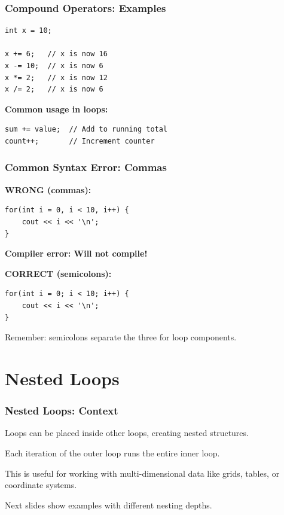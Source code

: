 \documentclass{beamer}
\begin{document}
\begin{frame}[fragile]
\frametitle{Compound Operators: Examples}
\begin{verbatim}
int x = 10;

x += 6;   // x is now 16
x -= 10;  // x is now 6
x *= 2;   // x is now 12
x /= 2;   // x is now 6
\end{verbatim}
\pause

\textbf{Common usage in loops:}
\begin{verbatim}
sum += value;  // Add to running total
count++;       // Increment counter
\end{verbatim}
\end{frame}

\begin{frame}[fragile]
\frametitle{Common Syntax Error: Commas}
\textbf{WRONG (commas):}
\begin{verbatim}
for(int i = 0, i < 10, i++) {
    cout << i << '\n';
}
\end{verbatim}
\pause

\textbf{Compiler error: Will not compile!}\pause

\textbf{CORRECT (semicolons):}
\begin{verbatim}
for(int i = 0; i < 10; i++) {
    cout << i << '\n';
}
\end{verbatim}

Remember: semicolons separate the three for loop components.
\end{frame}

\section{Nested Loops}

\begin{frame}
\frametitle{Nested Loops: Context}
Loops can be placed inside other loops, creating nested structures.\pause

Each iteration of the outer loop runs the entire inner loop.\pause

This is useful for working with multi-dimensional data like grids, tables, or coordinate systems.\pause

Next slides show examples with different nesting depths.
\end{frame}
\end{document}
